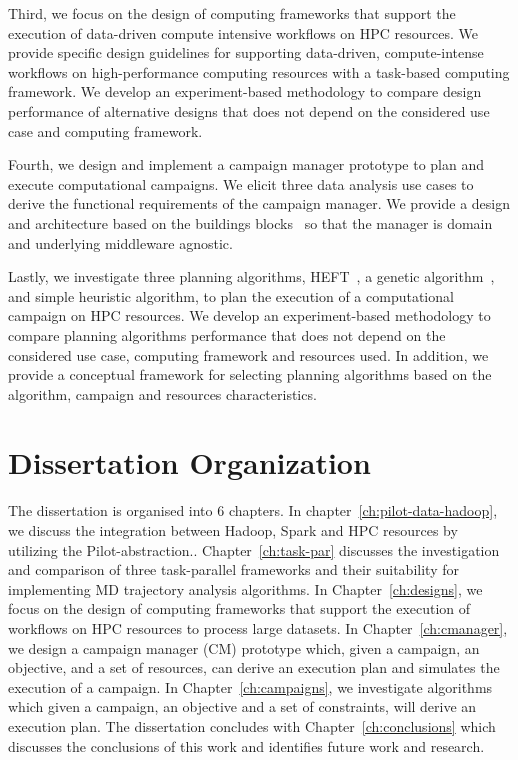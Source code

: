 Third, we focus on the design of computing frameworks that support the execution of data-driven compute intensive workflows on HPC resources.
We provide specific design guidelines for supporting data-driven, compute-intense workflows on high-performance computing resources with a task-based computing framework.
We develop an experiment-based methodology to compare design performance of alternative designs that does not depend on the considered use case and computing framework.

Fourth, we design and implement a campaign manager prototype to plan and execute computational campaigns.
We elicit three data analysis use cases to derive the functional requirements of the campaign manager.
We provide a design and architecture based on the buildings blocks~\cite{turilli2019middleware} so that the manager is domain and underlying middleware agnostic.

Lastly, we investigate three planning algorithms, HEFT~\cite{topcuoglu2002performance}, a genetic algorithm~\cite{page2005algorithm}, and simple heuristic algorithm, to plan the execution of a computational campaign on HPC resources.
We develop an experiment-based methodology to compare planning algorithms performance that does not depend on the considered use case, computing framework and resources used.
In addition, we provide a conceptual framework for selecting planning algorithms based on the algorithm, campaign and resources characteristics.

\section{Dissertation Organization}
The dissertation is organised into 6 chapters.
In chapter~\ref{ch:pilot-data-hadoop}, we discuss the integration between Hadoop, Spark and HPC resources by utilizing the Pilot-abstraction..
Chapter~\ref{ch:task-par} discusses the investigation and comparison of three task-parallel frameworks and their suitability for implementing MD trajectory analysis algorithms.
In Chapter~\ref{ch:designs}, we focus on the design of computing frameworks that support the execution of workflows on HPC resources to process large datasets.
In Chapter~\ref{ch:cmanager}, we design a campaign manager (CM) prototype which, given a campaign, an objective, and a set of resources, can derive an execution plan and simulates the execution of a campaign.
In Chapter~\ref{ch:campaigns}, we investigate algorithms which given a campaign, an objective and a set of constraints, will derive an execution plan.
The dissertation concludes with Chapter~\ref{ch:conclusions} which discusses the conclusions of this work and identifies future work and research.

